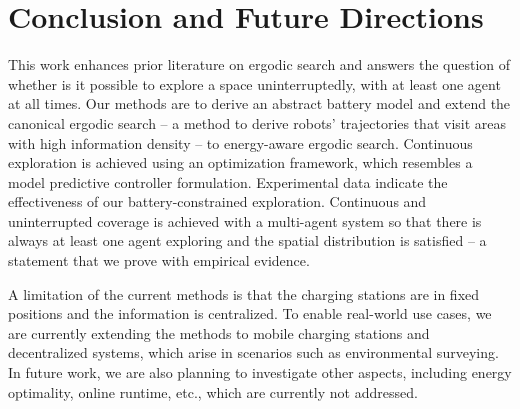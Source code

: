 \documentclass[letterpaper,10pt,conference,twoside]{IEEEtran}
\theoremstyle{definition}
\begin{document}
\section{Conclusion and Future Directions}\label{sec:conc}
\noindent
This work enhances prior literature on ergodic search and %
answers the question of whether is it possible to explore a space uninterruptedly, with at least one agent at all times. %
Our methods are to derive an abstract battery model and extend the canonical ergodic search -- a method to derive robots' trajectories that visit areas with high information density -- to energy-aware ergodic search. Continuous exploration is achieved using an %
optimization framework, which resembles a model predictive controller formulation. 
Experimental data indicate the effectiveness of our battery-constrained exploration. Continuous and uninterrupted coverage is achieved with a multi-agent system so that there is always at least one agent exploring and the spatial distribution is satisfied -- a statement that we prove with empirical evidence.

A limitation of the current methods is that the charging stations are in fixed positions and the information is centralized. To enable real-world use cases, we are currently extending the methods to mobile charging stations and decentralized %
systems, which arise in scenarios such as environmental surveying. In future work, we are also planning to investigate other aspects, including energy optimality, online runtime, etc., which are currently not addressed. %

{\small
 

}
\end{document}

